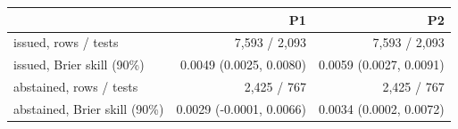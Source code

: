 \begin{tabular}{lrr}
\toprule
 & P1 & P2 \\
\midrule
issued, rows / tests & 7,593 / 2,093 & 7,593 / 2,093 \\
issued, Brier skill (90\%) & 0.0049 (0.0025, 0.0080) & 0.0059 (0.0027, 0.0091) \\
abstained, rows / tests & 2,425 / 767 & 2,425 / 767 \\
abstained, Brier skill (90\%) & 0.0029 (-0.0001, 0.0066) & 0.0034 (0.0002, 0.0072) \\
\midrule

\end{tabular}

